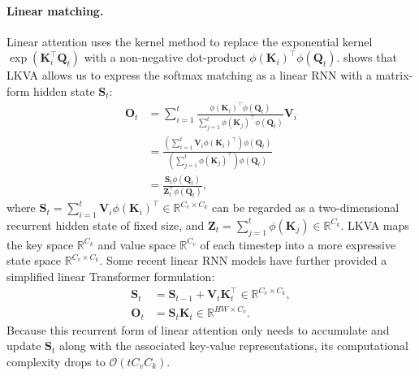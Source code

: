 \paragraph{Linear matching.}
Linear attention \cite{katharopoulos_transformers_2020,sun_retentive_2023} uses the kernel method to replace the exponential kernel $\exp(\boldsymbol{K}_i^\intercal \boldsymbol{Q}_t)$ with a non-negative dot-product $\phi(\boldsymbol{K}_i)^\intercal \phi(\boldsymbol{Q}_t)$. 
 shows that LKVA allows us to express the softmax matching as a linear RNN with a matrix-form hidden state $\mathbf{S}_t$:
\begin{equation}
	\begin{split}		
		\boldsymbol{O}_t    &= \sum_{i=1}^{t} \frac{ \phi(\boldsymbol{K}_i)^{\intercal} \phi(\boldsymbol{Q}_t)}{\sum_{j=1}^{t} \phi(\boldsymbol{K}_j)^{\intercal} \phi(\boldsymbol{Q}_t)} \boldsymbol{V}_i \\
							&= \frac{ (\sum_{i=1}^{t} \boldsymbol{V}_i \phi(\boldsymbol{K}_i)^{\intercal}) \phi(\boldsymbol{Q}_t)}{ (\sum_{j=1}^{t} \phi(\boldsymbol{K}_j)^{\intercal}) \phi(\boldsymbol{Q}_t)}  \\
							&= \frac{ \mathbf{S}_t \phi(\boldsymbol{Q}_t)}{ \boldsymbol{Z}_t^{\intercal} \phi(\boldsymbol{Q}_t)} ,
	\end{split}
	\label{eq:the_linear_attention}
\end{equation}
where $\mathbf{S}_t = \sum_{i=1}^t \boldsymbol{V}_i \phi(\boldsymbol{K}_i)^\intercal \in \mathbb{R}^{C_v \times C_k}$ can be regarded as a two-dimensional recurrent hidden state of fixed size,
and $\boldsymbol{Z}_t=\sum_{j=1}^t\phi(\boldsymbol{K}_j)\in\mathbb{R}^{C_k}$. 
LKVA maps the key space $\mathbb{R}^{C_k}$ and value space $\mathbb{R}^{C_v}$ of each timestep into a more expressive state space $\mathbb{R}^{C_v \times C_k}$.
%
Some recent linear RNN models \cite{yang2024parallelizing, qin_devil_2022, schlag_linear_2021, parallel-martin} have further provided a simplified linear Transformer formulation:
\begin{equation}
    \begin{split}
	\mathbf{S}_t    	&= \mathbf{S}_{t-1} + \boldsymbol{V}_t \boldsymbol{K}_t^{\intercal} \in \mathbb{R}^{C_v \times C_k}, \\
	\boldsymbol{O}_t	&= \mathbf{S}_t \boldsymbol{K}_t \in \mathbb{R}^{HW \times C_v}.
    \end{split}
    \label{eq:the_recurrent_form}
\end{equation}
%
Because this recurrent form of linear attention only needs to accumulate and update $\mathbf{S}_t$ along with the associated key-value representations, its computational complexity drops to $\mathcal{O}(t C_v C_k)$. 

